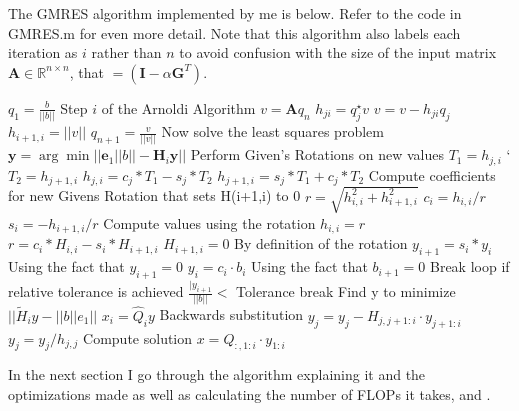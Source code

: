 \documentclass{article}
\newcommand{\RR}{\mathbb{R}}
\begin{document}
\begin{enumerate}
	\newpage
	The GMRES algorithm implemented by me is below. Refer to the code in GMRES.m for even more detail. Note that this algorithm also labels each iteration as $i$ rather than $n$ to avoid confusion with the size of the input matrix $\boldsymbol{A} \in \RR^{n \times n}$, that $= (\boldsymbol{I} - \alpha \boldsymbol{G}^T)$.
	
	\begin{algorithmic}
	\State $q_1 = \frac{b}{  || b ||}$ 
		\State Step $i$ of the Arnoldi Algorithm 
		\State $v = \boldsymbol{A} q_n$ 
			\State $h_{ji} = q^\star_j v$
			\State $v = v - h_{ji}q_j$
		\EndFor
		\State $h_{i+1,i} = ||v||$
		\State $q_{n+1} = \frac{v}{||v||}$
		\State Now solve the least squares problem $\boldsymbol{y} = \arg\min || \boldsymbol{e}_1||b|| - \boldsymbol{H}_i \boldsymbol{y} ||$
		\State Perform Given's Rotations on new values
        	\State $T_1 = h_{j,i}$ 	`	
        	\State $T_2 = h_{ j+1, i}$  
        	\State $h_{j,i} = c_j * T_1 - s_j * T_2$
        	\State $h_{ j+1, i} = s_j * T_1 + c_j * T_2$
		\EndFor
    \State Compute coefficients for new Givens Rotation that sets H(i+1,i) to 0
    \State $r = \sqrt{ h_{i,i}^2 + h_{i+1, i}^2}$
    \State $c_i = h_{i,i} / r$
    \State $s_i = - h_{ i+1, i} / r$
    \State Compute values using the rotation
    \State $h_{i,i} = r$             \Comment $r = c_i*H_{i,i} - s_i* H_{i+1,i}$
    \State $H_{ i+1, i} = 0$         \Comment By definition of the rotation
    \State $y_{i+1} = s_i * y_i$     \Comment Using the fact that $y_{i+1} = 0$
    \State $y_i = c_i \cdot b_i$    	 \Comment Using the fact that $b_{i+1} = 0$
    \State Break loop if relative tolerance is achieved
    \If $\frac{| y_{i+1}}{ || b ||} <$ Tolerance
        \State break
    \EndIf    
		\State Find y to minimize $|| \tilde{H}_iy - ||b||e_1 ||$
		\State $x_i = \hat{Q}_i y$
	\EndFor
	\State Backwards substitution
    	\State $y_j = y_j - H_{j,j+1:i} \cdot y_{j+1:i}$
    	\State $y_j = y_j / h_{j,j}$
	\EndFor
  	\State Compute solution
	\State $x = Q_{:,1:i} \cdot y_{1:i}$
	\end{algorithmic}
	 
	\newpage
	In the next section I go through the algorithm explaining it and the optimizations made as well as calculating the number of FLOPs it takes, and .
	

\end{enumerate}
\end{document}

